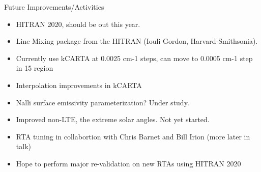 \documentclass[10pt,t]{beamer}
\begin{document}
\begin{frame}{Future Improvements/Activities}

  \begin{itemize}
  \item HITRAN 2020, should be out this year.
  \item Line Mixing package from the HITRAN (Iouli Gordon, Harvard-Smithsonia).
  \item Currently use kCARTA at 0.0025 cm-1 steps, can move to 0.0005 cm-1 step in 15 \um region
  \item Interpolation improvements in kCARTA
  \item Nalli surface emissivity parameterization?  Under study.
  \item Improved non-LTE, the extreme solar angles.  Not yet started.
  \item RTA tuning in collabortion with Chris Barnet and Bill Irion (more later in talk)
  \item Hope to perform major re-validation on new RTAs using HITRAN 2020
  \end{itemize}
\end{frame}
\end{document}

